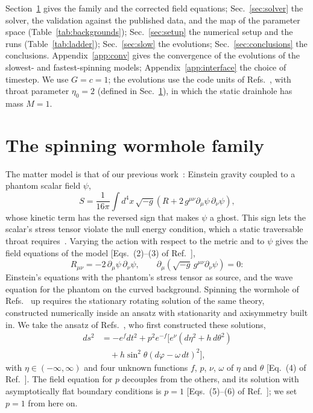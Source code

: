 \documentclass[twocolumn,floatfix,aps,prd,superscriptaddress,nofootinbib]{revtex4-2}
\begin{document}
Section~\ref{sec:model} gives the family and the corrected field equations; Sec.~\ref{sec:solver} the solver, the validation against the published data, and the map of the parameter space (Table~\ref{tab:backgrounds}); Sec.~\ref{sec:setup} the numerical setup and the runs (Table~\ref{tab:ladder}); Sec.~\ref{sec:slow} the evolutions; Sec.~\ref{sec:conclusions} the conclusions. Appendix~\ref{app:conv} gives the convergence of the evolutions of the slowest- and fastest-spinning models; Appendix~\ref{app:interface} the choice of timestep. We use $G=c=1$; the evolutions use the code units of Refs.~\cite{shirokov2026,shirokov2026c}, with throat parameter $\eta_0=2$ (defined in Sec.~\ref{sec:model}), in which the static drainhole has mass $M=1$.

\section{The spinning wormhole family}
\label{sec:model}

The matter model is that of our previous work~\cite{shirokov2026,shirokov2026c}: Einstein gravity coupled to a phantom scalar field $\psi$,
\begin{equation}
S=\frac{1}{16\pi}\int d^4x\,\sqrt{-g}\left(R+2\,g^{\mu\nu}\partial_\mu\psi\,\partial_\nu\psi\right),
\label{eq:action}
\end{equation}
whose kinetic term has the reversed sign that makes $\psi$ a ghost. This sign lets the scalar's stress tensor violate the null energy condition, which a static traversable throat requires~\cite{morris_thorne1988,visser1995}. Varying the action with respect to the metric and to $\psi$ gives the field equations of the model [Eqs.~(2)--(3) of Ref.~\cite{chew2016}],
\begin{equation}
R_{\mu\nu}=-2\,\partial_\mu\psi\,\partial_\nu\psi,\qquad
\partial_\mu\!\left(\sqrt{-g}\,g^{\mu\nu}\partial_\nu\psi\right)=0:
\label{eq:fieldeqs}
\end{equation}
Einstein's equations with the phantom's stress tensor as source, and the wave equation for the phantom on the curved background. Spinning the wormhole of Refs.~\cite{shirokov2026,shirokov2026c} up requires the stationary rotating solution of the same theory, constructed numerically inside an ansatz with stationarity and axisymmetry built in. We take the ansatz of Refs.~\cite{kleihaus_kunz2014,chew2016}, who first constructed these solutions,
\begin{equation}
\begin{split}
ds^2&=-e^{f}dt^2+p^2e^{-f}\Big[e^{\nu}\left(d\eta^2+h\,d\theta^2\right)\\
&\quad+h\sin^2\!\theta\left(d\varphi-\omega\,dt\right)^2\Big],
\end{split}
\label{eq:metric}
\end{equation}
with $\eta\in(-\infty,\infty)$ and four unknown functions $f$, $p$, $\nu$, $\omega$ of $\eta$ and $\theta$ [Eq.~(4) of Ref.~\cite{chew2016}]. The field equation for $p$ decouples from the others, and its solution with asymptotically flat boundary conditions is $p=1$ [Eqs.~(5)--(6) of Ref.~\cite{chew2016}]; we set $p=1$ from here on.
\end{document}

